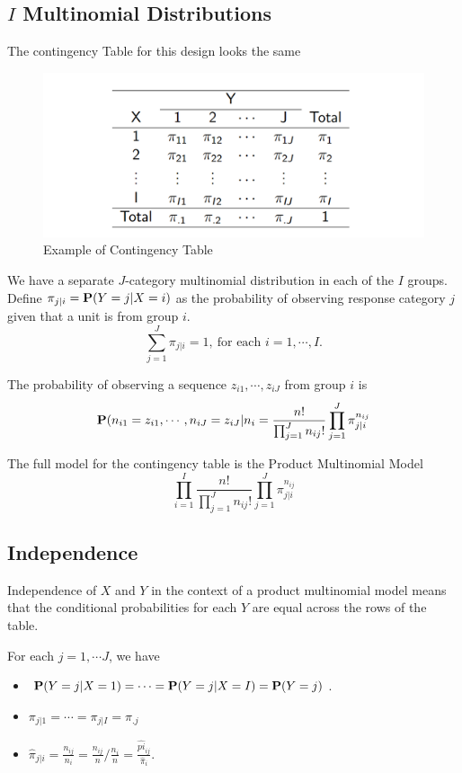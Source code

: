 \subsection{$I$ Multinomial Distributions}
The contingency Table for this design looks the same
\begin{figure}[H]
	\centering
	\includegraphics[width=0.7\linewidth]{fig/screenshot002}
	\caption{Example of Contingency Table}
	\label{fig:screenshot003}
\end{figure}

We have a separate $J$-category multinomial distribution in each of the $I$ groups. Define $\pi_{j|i} = \P(Y = j| X = i)$ as the probability of observing response category $j$ given that a unit is from group $i$.
\[\sum_{j= 1}^{J} \pi_{j|i} = 1, ~\text{for each } i = 1, \cdots, I.\]

The probability of observing a sequence $z_{i1}, \cdots, z_{iJ}$ from group $i$ is
\[\P(n_{i1} = z_{i1}, \cdots, n_{iJ} = z_{iJ}|n_i = \frac{n!}{\prod_{j=1}^{J} n_{ij}!} \prod_{j=1}^{J} \pi_{j|i}^{n_{ij}}\]

The full model for the contingency table is the Product Multinomial Model
\[\prod_{i=1}^{I} \frac{n!}{\prod_{j=1}^{J} n_{ij}!} \prod_{j=1}^{J} \pi_{j|i}^{n_{ij}} \]

\subsection{Independence}
Independence of $X$ and $Y$ in the context of a product multinomial
model means that the conditional probabilities for each $Y$ are equal
across the rows of the table.

For each $j = 1, \cdots J$, we have
\begin{itemize}
	\item $\P(Y = j| X = 1) = \cdots = \P(Y = j| X = I) = \P(Y = j)$.
	\item $\pi_{j|1} = \cdots = \pi_{j|I} = \pi_{.j}$
	\item $\hat{\pi}_{j|i} = \frac{n_{ij}}{n_i} = \frac{n_{ij}}{n} / \frac{n_i}{n} = \frac{\hat{pi}_{ij}}{\hat{\pi}_i}$.
\end{itemize}

